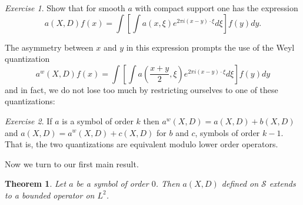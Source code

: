 \documentclass[11pt]{article}
\newtheorem{thm}{Theorem}
\theoremstyle{remark}
\newtheorem{exr}{Exercise}
\newcommand{\calS}{\mathcal{S}}
\newcommand{\1}{\textbf{1}}
\begin{document}
\begin{exr}
Show that for smooth $a$ with compact support one has the expression
\[
a(X,D)f(x) = \int \left[\int a(x,\xi) e^{2 \pi i(x-y) \cdot \xi} d\xi \right]f(y) dy.
\]
\end{exr}
The asymmetry between $x$ and $y$ in this expression prompts the use of the Weyl quantization
\[
a^w(X,D)f(x) = \int \left[\int a\left(\frac{x+y}{2},\xi \right) e^{2 \pi i(x-y) \cdot \xi} d\xi \right]f(y) dy
\]
and in fact, we do not lose too much by restricting ourselves to one of these quantizations:
\begin{exr}
If $a$ is a symbol of order $k$ then $a^w(X,D) = a(X,D) + b(X,D)$ and $a(X,D) = a^w(X,D) + c(X,D)$ for $b$ and $c$, symbols of order $k-1$. That is, the two quantizations are equivalent modulo lower order operators.
\end{exr}
Now we turn to our first main result.
\begin{thm}
Let $a$ be a symbol of order $0$. Then $a(X,D)$ defined on $\calS$ extends to a bounded operator on $L^2$.
\label{thm:l2bdd}
\end{thm}
\end{document}
